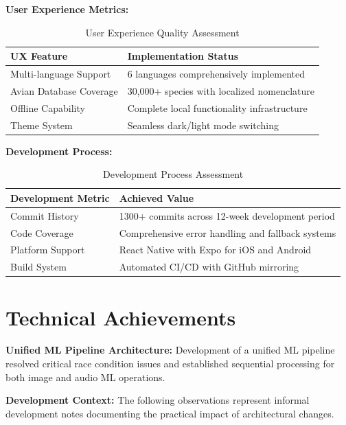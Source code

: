 \textbf{User Experience Metrics:}

\begin{table}[H]
\centering
\begin{tabular}{|l|l|}
\hline
\textbf{UX Feature} & \textbf{Implementation Status} \\
\hline
Multi-language Support & 6 languages comprehensively implemented \\
Avian Database Coverage & 30,000+ species with localized nomenclature \\
Offline Capability & Complete local functionality infrastructure \\
Theme System & Seamless dark/light mode switching \\
\hline
\end{tabular}
\caption{User Experience Quality Assessment}
\label{tab:ux_metrics}
\end{table}

\textbf{Development Process:}

\begin{table}[H]
\centering
\begin{tabular}{|l|l|}
\hline
\textbf{Development Metric} & \textbf{Achieved Value} \\
\hline
Commit History & 1300+ commits across 12-week development period \\
Code Coverage & Comprehensive error handling and fallback systems \\
Platform Support & React Native with Expo for iOS and Android \\
Build System & Automated CI/CD with GitHub mirroring \\
\hline
\end{tabular}
\caption{Development Process Assessment}
\label{tab:development_metrics}
\end{table}

\section{Technical Achievements}

\textbf{Unified ML Pipeline Architecture:} Development of a unified ML pipeline resolved critical race condition issues and established sequential processing for both image and audio ML operations.

\textbf{Development Context:} The following observations represent informal development notes documenting the practical impact of architectural changes.

